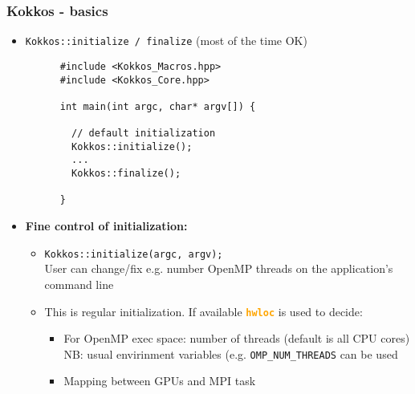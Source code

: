 \begin{frame}[fragile=singleslide]
  \frametitle{Kokkos - basics}

  \begin{itemize}
  \item \texttt{Kokkos::initialize / finalize} (most of the time OK)
    \begin{verbatim}
      #include <Kokkos_Macros.hpp>
      #include <Kokkos_Core.hpp>
      
      int main(int argc, char* argv[]) {
        
        // default initialization
        Kokkos::initialize();
        ...
        Kokkos::finalize();
        
      }
    \end{verbatim}
  \item \textbf{Fine control of initialization:}
    \begin{itemize}
    \item \texttt{Kokkos::initialize(argc, argv);}\\
      User can change/fix e.g. number OpenMP threads on the application's command line
    \item This is regular initialization. If available \textcolor{orange}{\textbf{\texttt{hwloc}}} is used to decide:
      \begin{itemize}
      \item For OpenMP exec space: number of threads (default is all CPU cores)\\
        NB: usual envirinment variables (e.g. \texttt{OMP\_NUM\_THREADS} can be used
      \item Mapping between GPUs and MPI task
      \end{itemize}
    \end{itemize}
  \end{itemize}
  
\end{frame}



